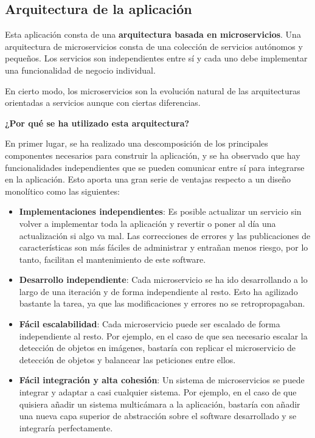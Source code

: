 


\pagestyle{miEstilo501}


\subsection{Arquitectura de la aplicación}

Esta aplicación consta de una \textbf{arquitectura basada en microservicios}. Una arquitectura de microservicios \cite{ref25} consta de una colección de servicios autónomos y pequeños. Los servicios son independientes entre sí y cada uno debe implementar una funcionalidad de negocio individual.

En cierto modo, los microservicios son la evolución natural de las arquitecturas orientadas a servicios aunque con ciertas diferencias.

\newpage

\textbf{¿Por qué se ha utilizado esta arquitectura?}

En primer lugar, se ha realizado una descomposición de los principales componentes necesarios para construir la aplicación, y se ha observado que hay funcionalidades independientes que se pueden comunicar entre sí para integrarse en la aplicación. Esto aporta una gran serie de ventajas respecto a un diseño monolítico \cite{ref26} como las siguientes:

\begin{itemize}
\item \textbf{Implementaciones independientes}: Es posible actualizar un servicio sin volver a implementar toda la aplicación y revertir o poner al día una actualización si algo va mal. Las correcciones de errores y las publicaciones de características son más fáciles de administrar y entrañan menos riesgo, por lo tanto, facilitan el mantenimiento de este software.

\item \textbf{Desarrollo independiente}: Cada microservicio se ha ido desarrollando a lo largo de una iteración y de forma independiente al resto. Esto ha agilizado bastante la tarea, ya que las modificaciones y errores no se retropropagaban.

\item \textbf{Fácil escalabilidad}: Cada microservicio puede ser escalado de forma independiente al resto. Por ejemplo, en el caso de que sea necesario escalar la detección de objetos en imágenes, bastaría con replicar el microservicio de detección de objetos y balancear las peticiones entre ellos.

\item \textbf{Fácil integración y alta cohesión}: Un sistema de microservicios se puede integrar y adaptar a casi cualquier sistema. Por ejemplo, en el caso de que quisiera añadir un sistema multicámara a la aplicación, bastaría con añadir una nueva capa superior de abstracción sobre el software desarrollado y se integraría perfectamente.
\end{itemize}

